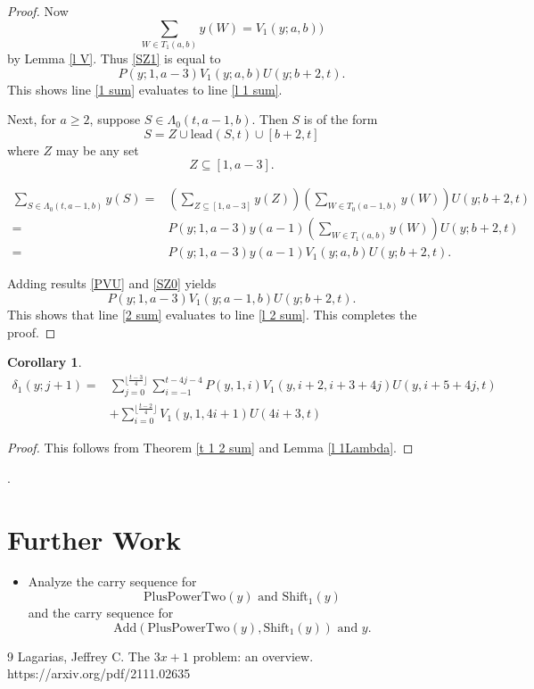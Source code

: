 \documentclass[11pt, oneside]{article}   	%
\newtheorem{corollary}{Corollary}
\begin{document}
\begin{proof}
Now
\[
\sum_{W \in T_1(a,b)} y(W) = V_1(y; a,b))
\]
by Lemma \ref{l V}. 
Thus \eqref{SZ1} is equal to 
\begin{equation} \label{PVU}
P(y; 1,a-3)V_1(y; a,b)U(y; b+2,t).
\end{equation}
This shows line \eqref{1 sum} evaluates to line \eqref{l 1 sum}. 

Next, for $a \geq 2$, suppose $S \in \Lambda_0(t,a-1,b)$. Then $S$ is of the form 
\[
S =  Z \cup \mathrm{lead}(S,t) \cup [b+2,t]
\]
where $Z$ may be any set 
\[
Z \subseteq [1,a-3].
\]

\begin{align} 
\sum_{S \in \Lambda_0(t,a-1,b)} y(S) =& \left (\sum_{Z \subseteq [1,a-3]} y(Z) \right ) \left (\sum_{W \in T_0(a-1,b)} y(W) \right ) U(y; b+2, t) \nonumber  \\
=& P(y; 1,a-3)y(a-1)\left(\sum_{W \in T_1(a,b)} y(W) \right)U(y; b+2, t)  \nonumber \\ 
= & P(y; 1,a-3)y(a-1)V_1(y; a,b)U(y; b+2,t).\label{SZ0}
\end{align}

Adding results \eqref{PVU} and \eqref{SZ0} yields 
\[
P(y; 1,a-3)V_1(y; a-1,b)U(y; b+2,t).
\]
This shows that line \eqref{2 sum} evaluates to line \eqref{l 2 sum}. This completes the proof. 
\end{proof}

\begin{corollary} 
 \begin{align}
\delta_1(y;j+1) =& \sum_{j=0}^{\lfloor \frac{t-3}{4}\rfloor}\sum_{i =-1}^{t-4j-4}P(y,1,i) V_1(y,i+2,i+3+4j) U(y,i+5+4j,t) \\
& + \sum_{i=0}^{\lfloor \frac{t-2}{4}\rfloor} V_1(y,1,4i+1) U(4i+3, t) 
\end{align}
\end{corollary}
\begin{proof} 
This follows from Theorem \ref{t 1 2 sum} and Lemma \ref{l 1Lambda}.  
\end{proof}. 

\section{Further Work}

\begin{itemize} 
\item Analyze the carry sequence for 
\[
\mathrm{PlusPowerTwo}(y) \text{ and } \mathrm{Shift_1}(y)
\]
 and the carry sequence for
 \[
\mathrm{Add}(\mathrm{PlusPowerTwo}(y), \mathrm{Shift_1}(y)) \text{ and } y. 
 \]
\end{itemize}

\begin{thebibliography}{9}
 Lagarias, Jeffrey C. The $3x+1$ problem: an overview. https://arxiv.org/pdf/2111.02635
\end{thebibliography}
\end{document}
